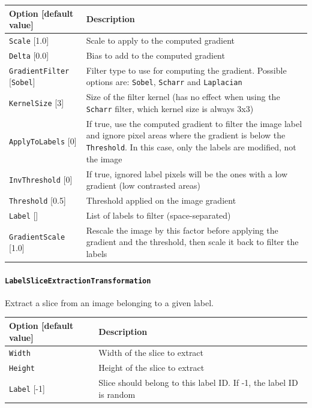 \documentclass[a4paper,11pt,oneside]{article}
\newcommand{\iponly}{\reversemarginpar
    \marginnote{\color{listletiblue}\normalfont\scriptsize
    {\ttfamily{}\hyperref[sec:N2D2-IP]{\color{listletiblue}N2D2 IP}} \emph{only}}}
\begin{document}
\begin{center}
 \begin{tabular}{| p{5cm} | p{10cm} | }
 \hline
 Option [default value] & Description\\
 \hline\hline
  \lstinline!Scale! [1.0] & Scale to apply to the computed gradient \\
  \lstinline!Delta! [0.0] & Bias to add to the computed gradient \\
  \lstinline!GradientFilter! [\lstinline!Sobel!] & Filter type to use for
  computing the gradient. Possible options are: \lstinline!Sobel!,
  \lstinline!Scharr! and \lstinline!Laplacian! \\
  \lstinline!KernelSize! [3] & Size of the filter kernel (has no effect when
  using the \lstinline!Scharr! filter, which kernel size is always 3x3) \\
  \lstinline!ApplyToLabels! [0] & If true, use the computed gradient to filter
  the image label and ignore pixel areas where the gradient is below the
   \lstinline!Threshold!. In this case, only the labels are modified, not the
    image \\\hline
  \lstinline!InvThreshold! [0] & If true, ignored label pixels will be the ones
  with a low gradient (low contrasted areas) \\
  \lstinline!Threshold! [0.5] & Threshold applied on the image gradient \\
  \lstinline!Label! [] & List of labels to filter (space-separated) \\
  \lstinline!GradientScale! [1.0] & Rescale the image by this factor before
  applying the gradient and the threshold, then scale it back to filter the
   labels \\
 \hline
\end{tabular}
\end{center}


\paragraph{\texorpdfstring{%
\lstinline[basicstyle=\ttfamily\bfseries]!LabelSliceExtractionTransformation!%
\protect\iponly}{LabelSliceExtractionTransformation}}
Extract a slice from an image belonging to a given label.

\begin{center}
 \begin{tabular}{| p{5cm} | p{10cm} | }
 \hline
 Option [default value] & Description\\
 \hline\hline
  \cellcolor{requiredcolor}\lstinline!Width! & Width of the slice to extract \\
  \cellcolor{requiredcolor}\lstinline!Height! & Height of the slice to
  extract \\
  \lstinline!Label! [-1] & Slice should belong to this label ID. If -1, the
  label ID is random \\
 \hline
\end{tabular}
\end{center}
\end{document}
